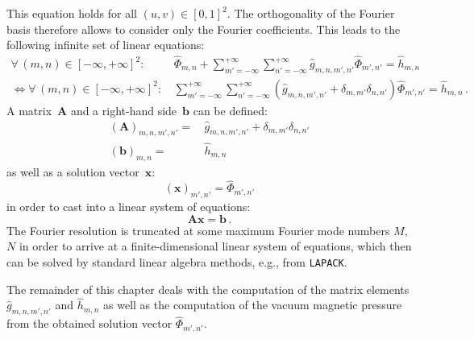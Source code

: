 This equation holds for all $(u,v) \in [0,1]^2$.
The orthogonality of the Fourier basis therefore allows to consider only the Fourier coefficients.
This leads to the following infinite set of linear equations:
\begin{align}
  \forall\, (m,n) \in [-\infty,+\infty]^2 :& \,
    \hat{\Phi}_{m,n}
  + \sum\limits_{m'=-\infty}^{+\infty} \sum\limits_{n'=-\infty}^{+\infty}
      \hat{g}_{m,n,m',n'} \hat{\Phi}_{m',n'}
  = \hat{h}_{m,n} \\
  \Leftrightarrow
  \forall\, (m,n) \in [-\infty,+\infty]^2 :& \,
  \sum\limits_{m'=-\infty}^{+\infty} \sum\limits_{n'=-\infty}^{+\infty}
    \left( \hat{g}_{m,n,m',n'} + \delta_{m,m'} \delta_{n,n'} \right) \hat{\Phi}_{m',n'}
  = \hat{h}_{m,n} \label{eqn:linsys_inf} \, .
\end{align}
%
A matrix~$\mathbf{A}$ and a right-hand side~$\mathbf{b}$
can be defined:
\begin{align}
 (\mathbf{A})_{m,n,m',n'} =&\, \hat{g}_{m,n,m',n'} + \delta_{m,m'} \delta_{n,n'} \\
 (\mathbf{b})_{m,n}       =&\, \hat{h}_{m,n}
\end{align}
as well as a solution vector~$\mathbf{x}$:
\begin{equation}
 (\mathbf{x})_{m',n'} = \hat{\Phi}_{m',n'}
\end{equation}
in order to cast  into a linear system of equations:
\begin{equation}
 \mathbf{A} \mathbf{x} = \mathbf{b} \, .
\end{equation}
The Fourier resolution is truncated at some maximum Fourier mode numbers $M$, $N$
in order to arrive at a finite-dimensional linear system of equations,
which then can be solved by standard linear algebra methods,
e.g., from \texttt{LAPACK}.

The remainder of this chapter
deals with the computation of the matrix elements
$\hat{g}_{m,n,m',n'}$ and $\hat{h}_{m,n}$
as well as the computation of the vacuum magnetic pressure
from the obtained solution vector $\hat{\Phi}_{m',n'}$.

\FloatBarrier

